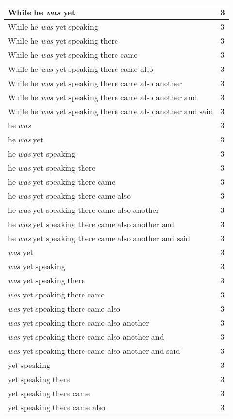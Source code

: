 \begin{center}
\begin{longtable}{|p{3.0in}|p{0.5in}|}
While he \emph{was} yet & 3\\ \hline 
While he \emph{was} yet speaking & 3\\ \hline 
While he \emph{was} yet speaking there & 3\\ \hline 
While he \emph{was} yet speaking there came & 3\\ \hline 
While he \emph{was} yet speaking there came also & 3\\ \hline 
While he \emph{was} yet speaking there came also another & 3\\ \hline 
While he \emph{was} yet speaking there came also another and & 3\\ \hline 
While he \emph{was} yet speaking there came also another and said & 3\\ \hline 
he \emph{was} & 3\\ \hline 
he \emph{was} yet & 3\\ \hline 
he \emph{was} yet speaking & 3\\ \hline 
he \emph{was} yet speaking there & 3\\ \hline 
he \emph{was} yet speaking there came & 3\\ \hline 
he \emph{was} yet speaking there came also & 3\\ \hline 
he \emph{was} yet speaking there came also another & 3\\ \hline 
he \emph{was} yet speaking there came also another and & 3\\ \hline 
he \emph{was} yet speaking there came also another and said & 3\\ \hline 
\emph{was} yet & 3\\ \hline 
\emph{was} yet speaking & 3\\ \hline 
\emph{was} yet speaking there & 3\\ \hline 
\emph{was} yet speaking there came & 3\\ \hline 
\emph{was} yet speaking there came also & 3\\ \hline 
\emph{was} yet speaking there came also another & 3\\ \hline 
\emph{was} yet speaking there came also another and & 3\\ \hline 
\emph{was} yet speaking there came also another and said & 3\\ \hline 
yet speaking & 3\\ \hline 
yet speaking there & 3\\ \hline 
yet speaking there came & 3\\ \hline 
yet speaking there came also & 3\\ \hline 

\end{longtable}
\end{center}
